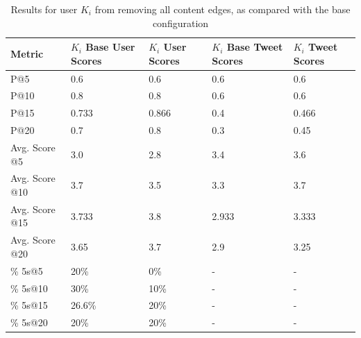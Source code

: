 \begin{table}
\centering
\begin{tabular}{l|p{2.2cm}|p{2.2cm}|p{2.2cm}|p{2.2cm}}
{\bf Metric} & {\bf $K_{i}$ Base User Scores} & {\bf $K_{i}$ User Scores} & {\bf $K_{i}$ Base Tweet Scores} & {\bf $K_{i}$ Tweet Scores} \\ \hline
P@5   & 0.6 & 0.6 & 0.6 & 0.6 \\ \hline
P@10 & 0.8 & 0.8 & 0.6 & 0.6 \\ \hline
P@15 & 0.733 & 0.866 & 0.4 & 0.466 \\ \hline
P@20 & 0.7 & 0.8 & 0.3 & 0.45 \\ \hline

Avg. Score @5   & 3.0 & 2.8 & 3.4 & 3.6 \\ \hline
Avg. Score @10 & 3.7 & 3.5 & 3.3 & 3.7 \\ \hline
Avg. Score @15 & 3.733 & 3.8 & 2.933 & 3.333 \\ \hline
Avg. Score @20 & 3.65 & 3.7 & 2.9 & 3.25 \\ \hline

\% 5s@5    & 20\% & 0\% & - & - \\ \hline
\% 5s@10  & 30\% & 10\% & - & - \\ \hline
\% 5s@15  & 26.6\% & 20\% & - & - \\ \hline
\% 5s@20  & 20\% & 20\% & - & - \\

\end{tabular}
\caption{Results for user $K_{i}$ from removing all content edges, as compared with the base configuration}
\label{tab:RemoveContent}
\end{table}


